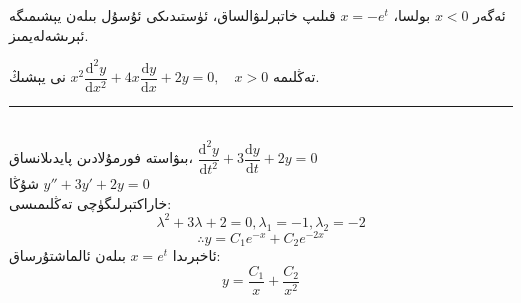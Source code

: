 ئەگەر 
$x<0$
بولسا،
$x=-e^t$
قىلىپ خاتېرلىۋالساق، ئۈستىدىكى ئۇسۇل بىلەن يېشىمىگە ئېرىشەلەيمىز.
\begin{myexample}
	تەڭلىمە
	$x^2\dfrac{\textrm{d}^2y}{\textrm{d}x^2}+4x\dfrac{\textrm{d}y}{\textrm{d}x}+2y=0, \quad x>0$
	نى يېشىڭ.
	\\\rule{\linewidth}{0.05em}\\
	بىۋاستە فورمۇلادىن پايدىلانساق،
	$\dfrac{\textrm{d}^2y}{\textrm{d}t^2}+3\dfrac{\textrm{d}y}{\textrm{d}t}+2y=0$\\
	شۇڭا
	$y''+3y'+2y=0$ \\
 خاراكتېرلىگۈچى تەڭلىمىسى:
	$$\lambda^2+3\lambda+2=0, \lambda_1=-1, \lambda_2=-2$$
	$$\therefore y=C_1e^{-x}+C_2e^{-2x}$$
	ئاخېرىدا
	$x=e^t $
	بىلەن ئالماشتۇرساق:
	$$y=\dfrac{C_1}{x}+\dfrac{C_2}{x^2}$$
	
\end{myexample}


